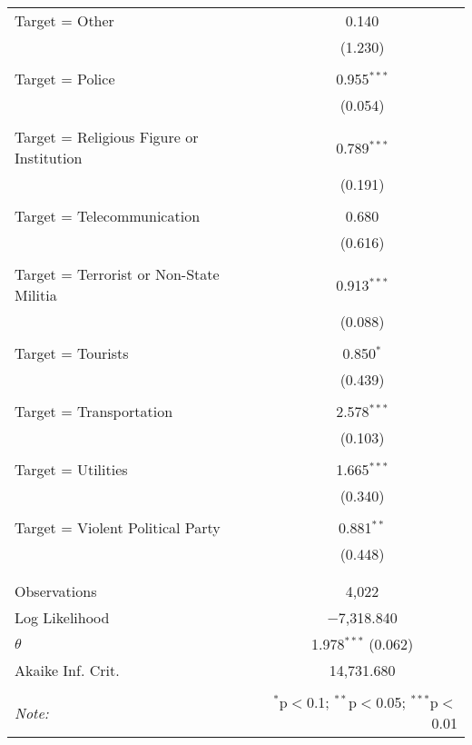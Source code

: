 \begin{table}[!htbp]
\begin{tabular}{@{\extracolsep{5pt}}lc}
 Target = Other & 0.140 \\ 
  & (1.230) \\ 
  & \\ 
 Target = Police & 0.955$^{***}$ \\ 
  & (0.054) \\ 
  & \\ 
 Target = Religious Figure or Institution & 0.789$^{***}$ \\ 
  & (0.191) \\ 
  & \\ 
 Target = Telecommunication & 0.680 \\ 
  & (0.616) \\ 
  & \\ 
 Target = Terrorist or Non-State Militia & 0.913$^{***}$ \\ 
  & (0.088) \\ 
  & \\ 
 Target = Tourists & 0.850$^{*}$ \\ 
  & (0.439) \\ 
  & \\ 
 Target = Transportation & 2.578$^{***}$ \\ 
  & (0.103) \\ 
  & \\ 
 Target = Utilities & 1.665$^{***}$ \\ 
  & (0.340) \\ 
  & \\ 
 Target = Violent Political Party & 0.881$^{**}$ \\ 
  & (0.448) \\ 
  & \\ 
\hline \\[-1.8ex] 
Observations & 4,022 \\ 
Log Likelihood & $-$7,318.840 \\ 
$\theta$ & 1.978$^{***}$  (0.062) \\ 
Akaike Inf. Crit. & 14,731.680 \\ 
\hline 
\hline \\[-1.8ex] 
\textit{Note:}  & \multicolumn{1}{r}{$^{*}$p$<$0.1; $^{**}$p$<$0.05; $^{***}$p$<$0.01} \\ 
\end{tabular} 
\end{table} 

